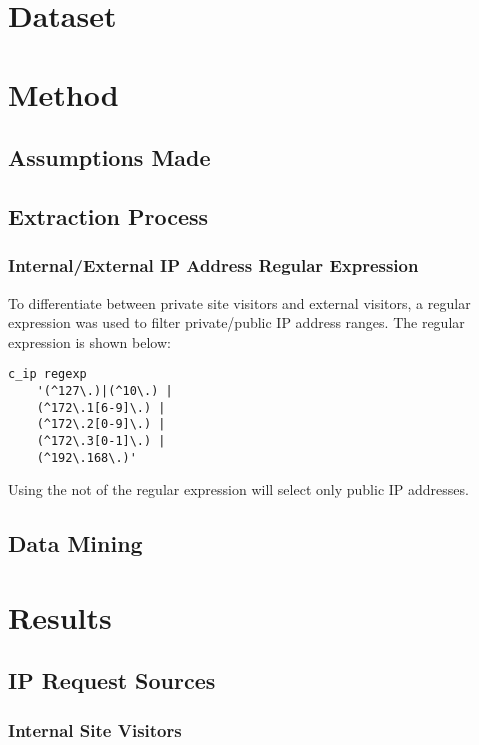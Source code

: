 \documentclass[12pt,titlepage]{article}
\begin{document}
\section{Dataset}

\section{Method}

\subsection{Assumptions Made}

\subsection{Extraction Process}

\subsubsection{Internal/External IP Address Regular Expression}

To differentiate between private site visitors and external visitors, a regular expression was used to filter private/public IP address ranges. The regular expression is shown below:

\begin{lstlisting}
c_ip regexp 
	'(^127\.)|(^10\.) | 
	(^172\.1[6-9]\.) |
	(^172\.2[0-9]\.) |
	(^172\.3[0-1]\.) |
	(^192\.168\.)'
\end{lstlisting}

Using the not of the regular expression will select only public IP addresses.

\subsection{Data Mining}

\section{Results}
\label{sec:results}

\subsection{IP Request Sources}

\subsubsection{Internal Site Visitors}
\end{document}
